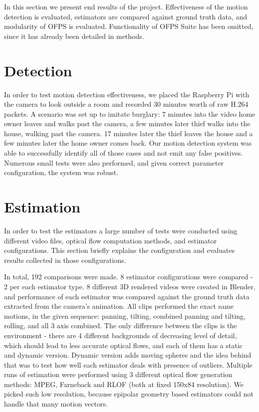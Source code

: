 \documentclass[11pt,english]{report}
\begin{document}
In this section we present end results of the project. Effectiveness of the motion detection is evaluated, estimators are compared against ground truth data, and modularity of OFPS is evaluated. Functionality of OFPS Suite has been omitted, since it has already been detailed in methods.

\section{Detection}

In order to test motion detection effectiveness, we placed the Raspberry Pi with the camera to look outside a room and recorded 30 minutes worth of raw H.264 packets. A scenario was set up to imitate burglary: 7 minutes into the video home owner leaves and walks past the camera, a few minutes later thief walks into the house, walking past the camera. 17 minutes later the thief leaves the house and a few minutes later the home owner comes back. Our motion detection system was able to successfully identify all of those cases and not emit any false positives. Numerous small tests were also performed, and given correct parameter configuration, the system was robust.

\section{Estimation}

In order to test the estimators a large number of tests were conducted using different video files, optical flow computation methods, and estimator configurations. This section briefly explains the configuration and evaluates results collected in those configurations.

In total, 192 comparisons were made. 8 estimator configurations were compared - 2 per each estimator type. 8 different 3D rendered videos were created in Blender, and performance of each estimator was compared against the ground truth data extracted from the camera's animation. All clips performed the exact same motions, in the given sequence: panning, tilting, combined panning and tilting, rolling, and all 3 axis combined. The only difference between the clips is the environment - there are 4 different backgrounds of decreasing level of detail, which should lead to less accurate optical flows, and each of them has a static and dynamic version. Dynamic version adds moving spheres and the idea behind that was to test how well each estimator deals with presence of outliers. Multiple runs of estimation were performed using 3 different optical flow generation methods: MPEG, Farneback and RLOF (both at fixed 150x84 resolution). We picked such low resolution, because epipolar geometry based estimators could not handle that many motion vectors.
\end{document}
